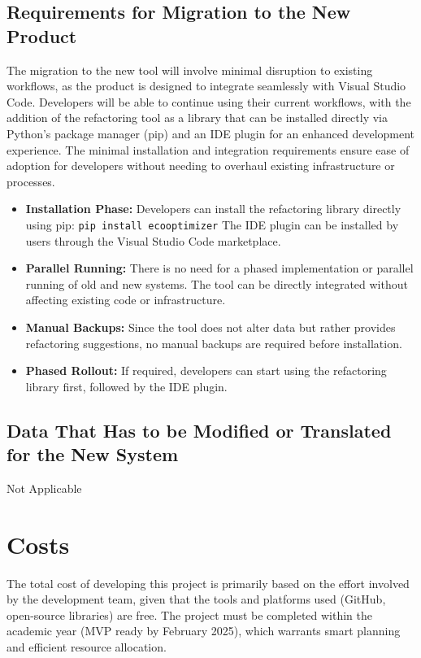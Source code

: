 \documentclass[12pt]{article}
\begin{document}
\subsection{Requirements for Migration to the New Product}
The migration to the new tool will involve minimal disruption to
existing workflows, as the product is designed to integrate
seamlessly with Visual Studio Code. Developers will be able to
continue using their current workflows, with the addition of the
refactoring tool as a library that can be installed directly via
Python's package manager (pip) and an IDE plugin for an enhanced
development experience. The minimal installation and integration
requirements ensure ease of adoption for developers without needing
to overhaul existing infrastructure or processes.
\begin{itemize}
  \item \textbf{Installation Phase:}
    Developers can install the refactoring library directly using pip:
    \verb|pip install ecooptimizer|
    The IDE plugin can be installed by users through the Visual
    Studio Code marketplace.
  \item \textbf{Parallel Running:}
    There is no need for a phased implementation or parallel running
    of old and new systems. The tool can be directly integrated
    without affecting existing code or infrastructure.
  \item \textbf{Manual Backups:}
    Since the tool does not alter data but rather provides
    refactoring suggestions, no manual backups are required before installation.
  \item \textbf{Phased Rollout:}
    If required, developers can start using the refactoring library
    first, followed by the IDE plugin.
\end{itemize}
\subsection{Data That Has to be Modified or Translated for the New System}
Not Applicable

\section{Costs}
The total cost of developing this project is primarily based on the
effort involved by the development team, given that the tools and
platforms used (GitHub, open-source libraries) are free. The project
must be completed within the academic year (MVP ready by February
2025), which warrants smart planning and efficient resource allocation.
\end{document}
